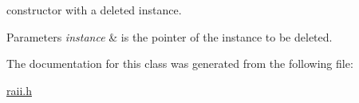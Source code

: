 constructor with a deleted instance. 


\begin{DoxyParams}{Parameters}
{\em instance} & is the pointer of the instance to be deleted. \\
\hline
\end{DoxyParams}


The documentation for this class was generated from the following file\-:\begin{DoxyCompactItemize}
\item 
\hyperlink{raii_8h}{raii.\-h}\end{DoxyCompactItemize}
